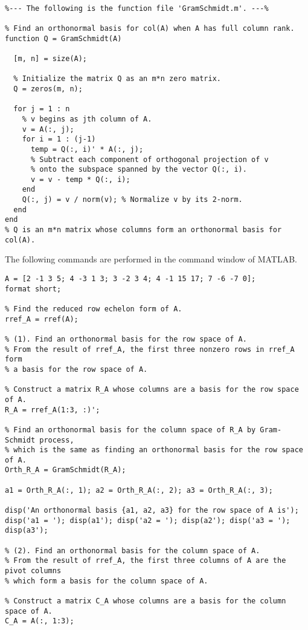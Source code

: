 \begin{sol}

\begin{verbatim}

%--- The following is the function file 'GramSchmidt.m'. ---%

% Find an orthonormal basis for col(A) when A has full column rank.
function Q = GramSchmidt(A)

  [m, n] = size(A);

  % Initialize the matrix Q as an m*n zero matrix.
  Q = zeros(m, n); 

  for j = 1 : n
    % v begins as jth column of A.
    v = A(:, j); 
    for i = 1 : (j-1)
      temp = Q(:, i)' * A(:, j);
      % Subtract each component of orthogonal projection of v
      % onto the subspace spanned by the vector Q(:, i).
      v = v - temp * Q(:, i);
    end
    Q(:, j) = v / norm(v); % Normalize v by its 2-norm.
  end
end
% Q is an m*n matrix whose columns form an orthonormal basis for col(A).
\end{verbatim}

The following commands are performed in the command window of MATLAB.

\begin{verbatim}
A = [2 -1 3 5; 4 -3 1 3; 3 -2 3 4; 4 -1 15 17; 7 -6 -7 0];
format short;

% Find the reduced row echelon form of A.
rref_A = rref(A); 

% (1). Find an orthonormal basis for the row space of A.
% From the result of rref_A, the first three nonzero rows in rref_A form
% a basis for the row space of A.

% Construct a matrix R_A whose columns are a basis for the row space of A.
R_A = rref_A(1:3, :)';

% Find an orthonormal basis for the column space of R_A by Gram-Schmidt process,
% which is the same as finding an orthonormal basis for the row space of A.
Orth_R_A = GramSchmidt(R_A);

a1 = Orth_R_A(:, 1); a2 = Orth_R_A(:, 2); a3 = Orth_R_A(:, 3);

disp('An orthonormal basis {a1, a2, a3} for the row space of A is');
disp('a1 = '); disp(a1'); disp('a2 = '); disp(a2'); disp('a3 = '); disp(a3');

% (2). Find an orthonormal basis for the column space of A.
% From the result of rref_A, the first three columns of A are the pivot columns
% which form a basis for the column space of A.

% Construct a matrix C_A whose columns are a basis for the column space of A.
C_A = A(:, 1:3);


\end{verbatim}
\end{sol}
